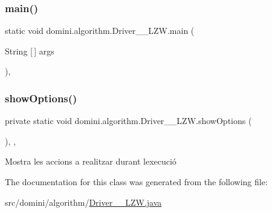 \subsubsection{\texorpdfstring{main()}{main()}}
{\footnotesize\ttfamily static void domini.\+algorithm.\+Driver\+\_\+\+\_\+\+L\+Z\+W.\+main (\begin{DoxyParamCaption}\item[{String \mbox{[}$\,$\mbox{]}}]{args }\end{DoxyParamCaption})\hspace{0.3cm}{\ttfamily [inline]}, {\ttfamily [static]}}

\mbox{\label{classdomini_1_1algorithm_1_1Driver____LZW_ad43ebe1afd0d4e5be51584c71a1789d2}} 
\subsubsection{\texorpdfstring{show\+Options()}{showOptions()}}
{\footnotesize\ttfamily private static void domini.\+algorithm.\+Driver\+\_\+\+\_\+\+L\+Z\+W.\+show\+Options (\begin{DoxyParamCaption}{ }\end{DoxyParamCaption})\hspace{0.3cm}{\ttfamily [inline]}, {\ttfamily [static]}, {\ttfamily [private]}}



Mostra les accions a realitzar durant l\textquotesingle{}execució 



The documentation for this class was generated from the following file\+:\begin{DoxyCompactItemize}
\item 
src/domini/algorithm/\hyperlink{Driver____LZW_8java}{Driver\+\_\+\+\_\+\+L\+Z\+W.\+java}\end{DoxyCompactItemize}
